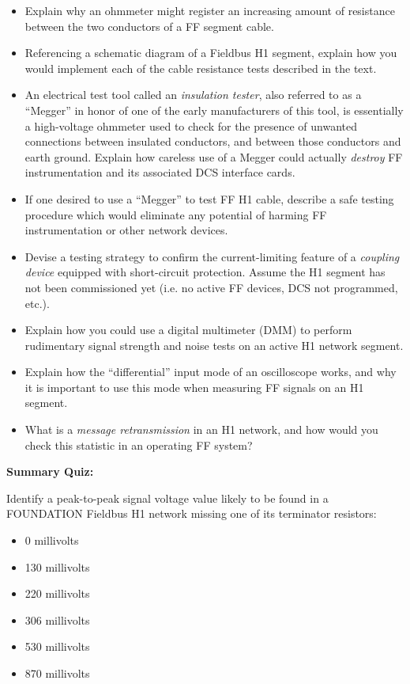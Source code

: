 \begin{itemize}
\item{} Explain why an ohmmeter might register an increasing amount of resistance between the two conductors of a FF segment cable.
\item{} Referencing a schematic diagram of a Fieldbus H1 segment, explain how you would implement each of the cable resistance tests described in the text.
\item{} An electrical test tool called an {\it insulation tester}, also referred to as a ``Megger'' in honor of one of the early manufacturers of this tool, is essentially a high-voltage ohmmeter used to check for the presence of unwanted connections between insulated conductors, and between those conductors and earth ground.  Explain how careless use of a Megger could actually {\it destroy} FF instrumentation and its associated DCS interface cards.
\item{} If one desired to use a ``Megger'' to test FF H1 cable, describe a safe testing procedure which would eliminate any potential of harming FF instrumentation or other network devices.
\item{} Devise a testing strategy to confirm the current-limiting feature of a {\it coupling device} equipped with short-circuit protection.  Assume the H1 segment has not been commissioned yet (i.e. no active FF devices, DCS not programmed, etc.).
\item{} Explain how you could use a digital multimeter (DMM) to perform rudimentary signal strength and noise tests on an active H1 network segment.
\item{} Explain how the ``differential'' input mode of an oscilloscope works, and why it is important to use this mode when measuring FF signals on an H1 segment.
\item{} What is a {\it message retransmission} in an H1 network, and how would you check this statistic in an operating FF system?
\end{itemize}








\vfil \eject

\noindent
{\bf Summary Quiz:}

Identify a peak-to-peak signal voltage value likely to be found in a FOUNDATION Fieldbus H1 network missing one of its terminator resistors:

\begin{itemize}
\item{} 0 millivolts
\vskip 5pt 
\item{} 130 millivolts
\vskip 5pt 
\item{} 220 millivolts
\vskip 5pt 
\item{} 306 millivolts
\vskip 5pt 
\item{} 530 millivolts
\vskip 5pt 
\item{} 870 millivolts
\end{itemize}



